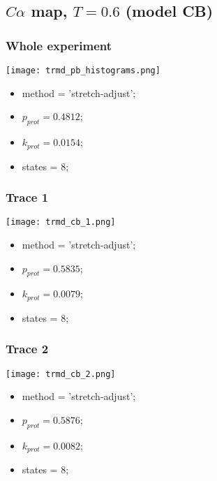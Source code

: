 \subsection{$C\alpha$ map, $T=0.6$ (model CB)}
\subsubsection{Whole experiment}
\begin{minipage}[c]{0.7\textwidth}
    \texttt{[image: trmd\_pb\_histograms.png]}
\end{minipage}
\hfill
\begin{minipage}[c]{0.45\textwidth}
    \begin{itemize}
        \item method = 'stretch-adjust';
        \item $p_{prot}=0.4812$;
        \item $k_{prot}=0.0154$;
        \item states = 8;
    \end{itemize}
\end{minipage}

\subsubsection{Trace 1}
\begin{minipage}[c]{0.7\textwidth}
	\texttt{[image: trmd\_cb\_1.png]}
\end{minipage}
\hfill
\begin{minipage}[c]{0.45\textwidth}
	\begin{itemize}
		\item method = 'stretch-adjust';
		\item $p_{prot}=0.5835$;
		\item $k_{prot}=0.0079$;
		\item states = 8;
	\end{itemize}
\end{minipage}

\subsubsection{Trace 2}
\begin{minipage}[c]{0.7\textwidth}
	\texttt{[image: trmd\_cb\_2.png]}
\end{minipage}
\hfill
\begin{minipage}[c]{0.45\textwidth}
	\begin{itemize}
		\item method = 'stretch-adjust';
		\item $p_{prot}=0.5876$;
		\item $k_{prot}=0.0082$;
		\item states = 8;
	\end{itemize}
\end{minipage}

